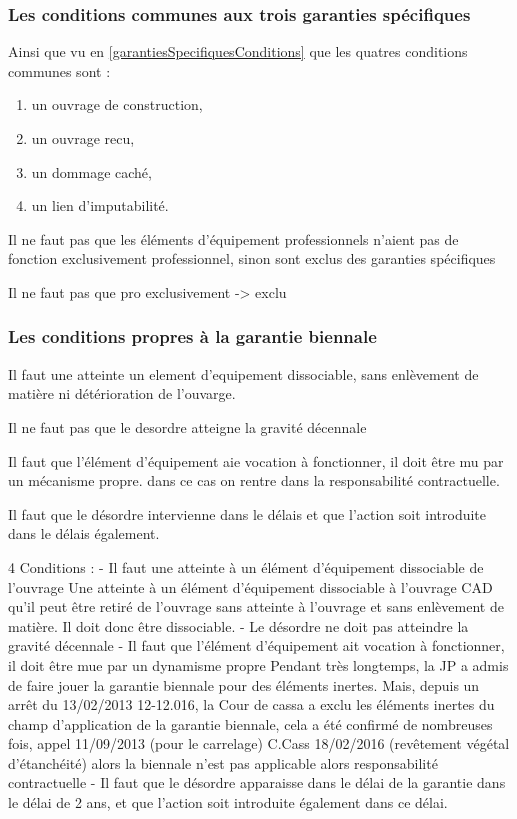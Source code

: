 		\subsubsection{Les conditions communes aux trois garanties spécifiques}

		Ainsi que vu en \vref{garantiesSpecifiquesConditions} que les quatres conditions communes sont :
		\begin{enumerate}
			\item un ouvrage de construction,
			\item un ouvrage recu,
			\item un dommage caché,
			\item un lien d'imputabilité.
		\end{enumerate}

		Il ne faut pas que les éléments d’équipement professionnels n’aient pas de fonction exclusivement professionnel, sinon sont exclus des garanties spécifiques

		Il ne faut pas que pro exclusivement -> exclu

		\subsubsection{Les conditions propres à la garantie biennale}\label{garantiesBiConditions}

		Il faut une atteinte un element d'equipement dissociable, \cad sans enlèvement de matière ni détérioration de l'ouvarge.

		Il ne faut pas que le desordre atteigne la gravité décennale

		Il faut que l'élément d'équipement aie vocation à fonctionner, il doit être mu par un mécanisme propre.  dans ce cas on rentre dans la responsabilité contractuelle.

		Il faut que le désordre intervienne dans le délais et que l'action soit introduite dans le délais également.

		4 Conditions :
		-	Il faut une atteinte à un élément d’équipement dissociable de l’ouvrage
		Une atteinte à un élément d’équipement dissociable à l’ouvrage CAD qu’il peut être retiré de l’ouvrage sans atteinte à l’ouvrage et sans enlèvement de matière. Il doit donc être dissociable.
		-	Le désordre ne doit pas atteindre la gravité décennale
		-	Il faut que l’élément d’équipement ait vocation à fonctionner, il doit être mue par un dynamisme propre
		Pendant très longtemps, la JP a admis de faire jouer la garantie biennale pour des éléments inertes.
		Mais, depuis un arrêt du 13/02/2013 12-12.016, la Cour de cassa a exclu les éléments inertes du champ d’application de la garantie biennale, cela a été confirmé de nombreuses fois, appel 11/09/2013 (pour le carrelage) C.Cass 18/02/2016 (revêtement végétal d’étanchéité) alors la biennale n’est pas applicable alors responsabilité contractuelle
		-	Il faut que le désordre apparaisse dans le délai de la garantie dans le délai de 2 ans, et que l’action soit introduite également dans ce délai.




